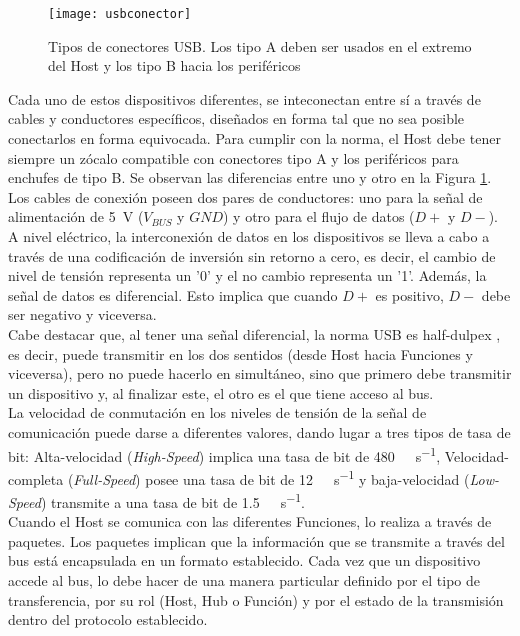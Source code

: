 \begin{figure}[]
	\centering
	\texttt{[image: usbconector]}
	\caption{Tipos de conectores USB. Los tipo A deben ser usados en el extremo del Host y los tipo B hacia los periféricos\cite{USBHardwareWiki}}
	\label{fig:con}
\end{figure}

Cada uno de estos dispositivos diferentes, se inteconectan entre sí a través de cables y conductores específicos, diseñados en forma tal que no sea posible conectarlos en forma equivocada. Para cumplir con la norma, el Host debe tener siempre un zócalo compatible con conectores tipo A y los periféricos para enchufes de tipo B. Se observan las diferencias entre uno y otro en la Figura \ref{fig:con}. Los cables de conexión poseen dos pares de conductores: uno para la señal de alimentación de \SI{5}{\volt} ($V_{BUS}$ y $GND$) y otro para el flujo de datos ($D+$ y $D-$).\\

A nivel eléctrico, la interconexión de datos en los dispositivos se lleva a cabo a través de una codificación de inversión sin retorno a cero, es decir, el cambio de nivel de tensión representa un '0' y el no cambio representa un '1'. Además, la señal de datos es diferencial. Esto implica que cuando $D+$ es positivo, $D-$ debe ser negativo y viceversa.\\

Cabe destacar que, al tener una señal diferencial, la norma USB es {half-dulpex \it}, es decir, puede transmitir en los dos sentidos (desde Host hacia Funciones y viceversa), pero no puede hacerlo en simultáneo\cite{Riihonen2015}, sino que primero debe transmitir un dispositivo y, al finalizar este, el otro es el que tiene acceso al bus.\\

La velocidad de conmutación en los niveles de tensión de la señal de comunicación puede darse a diferentes valores, dando lugar a tres tipos de tasa de bit: Alta-velocidad ({\it High-Speed}) implica una tasa de bit de \SI{480}{\mega\bit\per\second}, Velocidad-completa ({\it Full-Speed}) posee una tasa de bit de \SI{12}{\mega\bit\per\second} y baja-velocidad ({\it Low-Speed}) transmite a una tasa de bit de \SI{1.5}{\mega\bit\per\second}.\\

Cuando el Host se comunica con las diferentes Funciones, lo realiza a través de paquetes. Los paquetes implican que la información que se transmite a través del bus está encapsulada en un formato establecido. Cada vez que un dispositivo accede al bus, lo debe hacer de una manera particular definido por el tipo de transferencia, por su rol (Host, Hub o Función) y por el estado de la transmisión dentro del protocolo establecido.